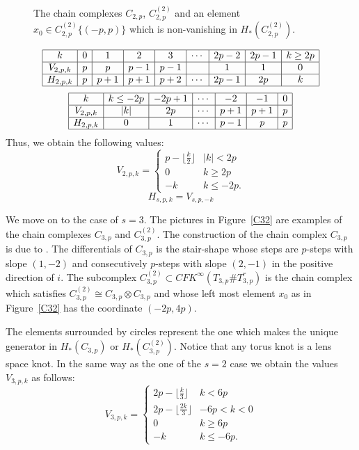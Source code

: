 \documentclass[11pt]{amsart}
\begin{document}
\begin{figure}[htbp]
\begin{center}
\caption{The chain complexes $C_{2,p}$, $C_{2,p}^{(2)}$ and an element $x_0\in C_{2,p}^{(2)}\{(-p,p)\}$ which is non-vanishing in $H_\ast(C_{2,p}^{(2)})$.}
\label{Cp2gene}
\end{center}\end{figure}
$$\begin{array}{|c|c|c|c|c|c|c|c|c|}\hline
k&0&1&2&3&\cdots&2p-2&2p-1&k\ge 2p\\\hline
V_{2,p,k}&p&p&p-1&p-1&&1&1&0\\\hline
H_{2,p,k}&p&p+1&p+1&p+2&\cdots&2p-1&2p&k\\\hline\end{array}$$
$$\begin{array}{|c|c|c|c|c|c|c|c|c|c|}\hline
k&k\le -2p&-2p+1&\cdots&-2&-1&0\\\hline
V_{2,p,k}&|k|&2p&\cdots&p+1&p+1&p\\\hline
H_{2,p,k}&0&1&\cdots&p-1&p&p\\\hline\end{array}$$
Thus, we obtain the following values:
$$V_{2,p,k}=\begin{cases}p-\lfloor\frac{k}{2}\rfloor&|k|<2p\\0&k\ge 2p\\-k&k\le -2p.\end{cases}$$
$$H_{s,p,k}=V_{s,p,-k}$$

We move on to the case of $s=3$.
The pictures in {\sc Figure}~\ref{C32} are examples of the chain complexes $C_{3,p}$ and $C_{3,p}^{(2)}$.
The construction of the chain complex $C_{3,p}$ is due to \cite{OSl}.
The differentials of $C_{3,p}$ is the stair-shape whose steps are $p$-steps with slope $(1,-2)$ and consecutively $p$-steps with slope $(2,-1)$ in the positive direction of $i$.
The subcomplex $C_{3,p}^{(2)}\subset CFK^\infty(T_{3,p}\#T_{3,p}^r)$ is the chain complex which satisfies $C_{3,p}^{(2)}\cong C_{3,p}\otimes C_{3,p}$ and 
whose left most element $x_0$ as in {\sc Figure}~\ref{C32} has the coordinate $(-2p,4p)$.

The elements surrounded by circles represent the one which makes the unique generator in $H_\ast(C_{3,p})$ or $H_\ast(C_{3,p}^{(2)})$.
Notice that any torus knot is a lens space knot.
In the same way as the one of the $s=2$ case we obtain the values $V_{3,p,k}$ as follows:
$$V_{3,p,k}=\begin{cases}2p-\lfloor\frac{k}{3}\rfloor&k<6p\\2p-\lfloor\frac{2k}{3}\rfloor&-6p<k<0\\0&k\ge 6p\\-k&k\le -6p.\end{cases}$$
\end{document}
